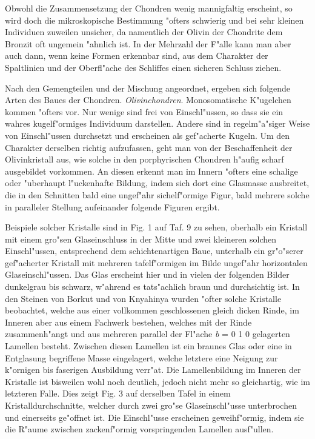 \documentclass[a4paper, 11pt, oneside, polutonikogreek, german]{article}
\begin{document}
Obwohl die Zusammensetzung der Chondren wenig mannigfaltig erscheint, so wird doch die mikroskopische Bestimmung "ofters schwierig und bei sehr kleinen Individuen zuweilen unsicher, da namentlich der Olivin der Chondrite dem Bronzit oft ungemein "ahnlich ist. In der Mehrzahl der F"alle kann man aber auch dann, wenn keine Formen erkennbar sind, aus dem Charakter der Spaltlinien und der Oberfl"ache des Schliffes einen sicheren Schluss ziehen.

Nach den Gemengteilen und der Mischung angeordnet, ergeben sich folgende Arten des Baues der Chondren. \emph{Olivinchondren}. Monosomatische K"ugelchen kommen "ofters vor. Nur wenige sind frei von Einschl"ussen, so dass sie ein wahres kugelf"ormiges Individuum darstellen. Andere sind in regelm"a"siger Weise von Einschl"ussen durchsetzt und erscheinen als gef"acherte Kugeln. Um den Charakter derselben richtig aufzufassen, geht man von der Beschaffenheit der Olivinkristall aus, wie solche in den porphyrischen Chondren h"aufig scharf ausgebildet vorkommen. An diesen erkennt man im Innern "ofters eine schalige oder "uberhaupt l"uckenhafte Bildung, indem sich dort eine Glasmasse ausbreitet, die in den Schnitten bald eine ungef"ahr sichelf"ormige Figur, bald mehrere solche in paralleler Stellung aufeinander folgende Figuren ergibt.

Beispiele solcher Kristalle sind in Fig. 1 auf Taf. 9 zu sehen, oberhalb ein Kristall mit einem gro"sen Glaseinschluss in der Mitte und zwei kleineren solchen Einschl"ussen, entsprechend dem schichtenartigen Baue, unterhalb ein gr"o"serer gef"acherter Kristall mit mehreren tafelf"ormigen im Bilde ungef"ahr horizontalen Glaseinschl"ussen. Das Glas erscheint hier und in vielen der folgenden Bilder dunkelgrau bis schwarz, w"ahrend es tats"achlich braun und durchsichtig ist. In den Steinen von Borkut und von Knyahinya wurden "ofter solche Kristalle beobachtet, welche aus einer vollkommen geschlossenen gleich dicken Rinde, im Inneren aber aus einem Fachwerk bestehen, welches mit der Rinde zusammenh"angt und aus mehreren parallel der Fl"ache \emph{b} = 0 1 0 gelagerten Lamellen besteht. Zwischen diesen Lamellen ist ein braunes Glas oder eine in Entglasung begriffene Masse eingelagert, welche letztere eine Neigung zur k"ornigen bis faserigen Ausbildung verr"at. Die Lamellenbildung im Inneren der Kristalle ist bisweilen wohl noch deutlich, jedoch nicht mehr so gleichartig, wie im letzteren Falle. Dies zeigt Fig. 3 auf derselben Tafel in einem Kristalldurchschnitte, welcher durch zwei gro"se Glaseinschl"usse unterbrochen und einerseits ge"offnet ist. Die Einschl"usse erscheinen geweihf"ormig, indem sie die R"aume zwischen zackenf"ormig vorspringenden Lamellen ausf"ullen.
\end{document}
